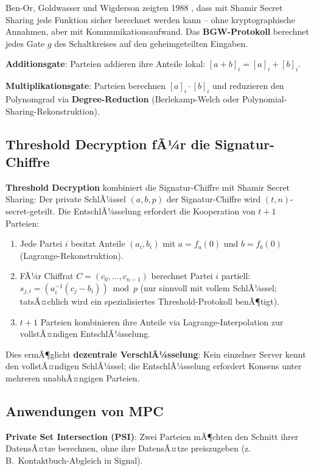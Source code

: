 ﻿\documentclass[a4paper,12pt]{scrreprt}
\theoremstyle{definition}
\begin{document}
Ben-Or, Goldwasser und Wigderson zeigten 1988 \cite{BGW88}, dass mit Shamir Secret Sharing jede Funktion sicher berechnet werden kann -- ohne kryptographische Annahmen, aber mit Kommunikationsaufwand. Das \textbf{BGW-Protokoll} berechnet jedes Gate $g$ des Schaltkreises auf den geheimgeteilten Eingaben.

\textbf{Additionsgate}: Parteien addieren ihre Anteile lokal: $[a+b]_i = [a]_i + [b]_i$.

\textbf{Multiplikationsgate}: Parteien berechnen $[a]_i \cdot [b]_i$ und reduzieren den Polynomgrad via \textbf{Degree-Reduction} (Berlekamp-Welch oder Polynomial-Sharing-Rekonstruktion).

\subsection{Threshold Decryption fÃ¼r die Signatur-Chiffre}

\textbf{Threshold Decryption} kombiniert die Signatur-Chiffre mit Shamir Secret Sharing: Der private SchlÃ¼ssel $(a, b, p)$ der Signatur-Chiffre wird $(t,n)$-secret-geteilt. Die EntschlÃ¼sselung erfordert die Kooperation von $t+1$ Parteien:

\begin{enumerate}
    \item Jede Partei $i$ besitzt Anteile $(a_i, b_i)$ mit $a = f_a(0)$ und $b = f_b(0)$ (Lagrange-Rekonstruktion).
    \item FÃ¼r Chiffrat $C = (c_0,\ldots,c_{n-1})$ berechnet Partei $i$ partiell: $s_{j,i} = (a_i^{-1}(c_j - b_i))\bmod p$ (nur sinnvoll mit vollem SchlÃ¼ssel; tatsÃ¤chlich wird ein spezialisiertes Threshold-Protokoll benÃ¶tigt).
    \item $t+1$ Parteien kombinieren ihre Anteile via Lagrange-Interpolation zur vollstÃ¤ndigen EntschlÃ¼sselung.
\end{enumerate}

Dies ermÃ¶glicht \textbf{dezentrale VerschlÃ¼sselung}: Kein einzelner Server kennt den vollstÃ¤ndigen SchlÃ¼ssel; die EntschlÃ¼sselung erfordert Konsens unter mehreren unabhÃ¤ngigen Parteien.

\subsection{Anwendungen von MPC}

\textbf{Private Set Intersection (PSI)}: Zwei Parteien mÃ¶chten den Schnitt ihrer DatensÃ¤tze berechnen, ohne ihre DatensÃ¤tze preiszugeben (z.\,B.\ Kontaktbuch-Abgleich in Signal).
\end{document}
